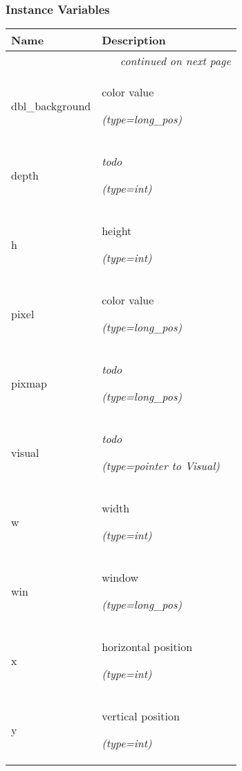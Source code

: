
  \subsubsection{Instance Variables}

    \vspace{-1cm}
\hspace{\varindent}\begin{longtable}{|p{\varnamewidth}|p{\vardescrwidth}|l}
\cline{1-2}
\cline{1-2} \centering \textbf{Name} & \centering \textbf{Description}& \\
\cline{1-2}
\endhead\cline{1-2}\multicolumn{3}{r}{\small\textit{continued on next page}}\\\endfoot\cline{1-2}
\endlastfoot\raggedright d\-b\-l\-\_\-b\-a\-c\-k\-g\-r\-o\-u\-n\-d\- & \raggedright color value

            {\it (type=long\_pos)}&\\
\cline{1-2}
\raggedright d\-e\-p\-t\-h\- & \raggedright \emph{todo}

            {\it (type=int)}&\\
\cline{1-2}
\raggedright h\- & \raggedright height

            {\it (type=int)}&\\
\cline{1-2}
\raggedright p\-i\-x\-e\-l\- & \raggedright color value

            {\it (type=long\_pos)}&\\
\cline{1-2}
\raggedright p\-i\-x\-m\-a\-p\- & \raggedright \emph{todo}

            {\it (type=long\_pos)}&\\
\cline{1-2}
\raggedright v\-i\-s\-u\-a\-l\- & \raggedright \emph{todo}

            {\it (type=pointer to Visual)}&\\
\cline{1-2}
\raggedright w\- & \raggedright width

            {\it (type=int)}&\\
\cline{1-2}
\raggedright w\-i\-n\- & \raggedright window

            {\it (type=long\_pos)}&\\
\cline{1-2}
\raggedright x\- & \raggedright horizontal position

            {\it (type=int)}&\\
\cline{1-2}
\raggedright y\- & \raggedright vertical position

            {\it (type=int)}&\\
\cline{1-2}
\end{longtable}

